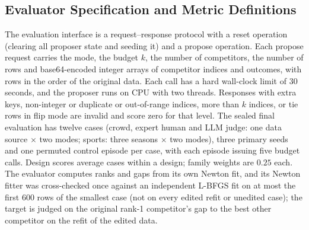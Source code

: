 \documentclass{article}
\begin{document}
\subsection{Evaluator Specification and Metric Definitions}
\label{app:eval}
The evaluation interface is a request--response protocol with a reset operation (clearing all proposer state and seeding it) and a propose operation. Each propose request carries the mode, the budget $k$, the number of competitors, the number of rows and base64-encoded integer arrays of competitor indices and outcomes, with rows in the order of the original data. Each call has a hard wall-clock limit of 30 seconds, and the proposer runs on CPU with two threads. Responses with extra keys, non-integer or duplicate or out-of-range indices, more than $k$ indices, or tie rows in flip mode are invalid and score zero for that level. %
The sealed final evaluation has twelve cases (crowd, expert human and LLM judge: one data source $\times$ two modes; sports: three seasons $\times$ two modes), three primary seeds and one permuted control episode per case, with each episode issuing five budget calls. %
Design scores average cases within a design; family weights are $0.25$ each. The evaluator computes ranks and gaps from its own Newton fit, and its Newton fitter was cross-checked once against an independent L-BFGS fit on at most the first 600 rows of the smallest case (not on every edited refit or unedited case); the target is judged on the original rank-1 competitor's gap to the best other competitor on the refit of the edited data.
\end{document}
